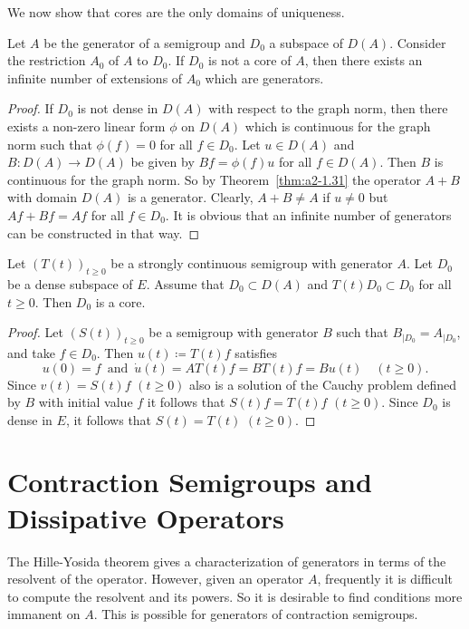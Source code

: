 We now show that cores are the only domains of uniqueness.
\begin{theorem}\label{thm:a2-1.33}
Let $A$ be the generator of a semigroup and $D_{0}$ a subspace of\/ $D(A)$.
Consider the restriction $A_{0}$ of\/ $A$ to $D_{0}$.
If\/ $D_{0}$ is not a core of\/ $A$, then there exists an infinite number of extensions of\/ $A_{0}$ which are generators.
\end{theorem}
\begin{proof}
If\/ $D_{0}$ is not dense in $D(A)$ with respect to the graph norm, then there exists a non-zero linear form $\phi$ on $D(A)$ which is continuous for the graph norm such that $\phi(f) = 0$ for all $f \in D_{0}$. 
Let $u \in D(A)$ and $B \colon D(A) \to D(A)$ be given by $Bf = \phi(f)u$ for all $f \in D(A)$.
Then $B$ is continuous for the graph norm.
So by Theorem~\ref{thm:a2-1.31}   the operator $A+B$ with domain $D(A)$ is a generator.
Clearly, $A+B \neq A$ if\/ $u \neq 0$ but $Af+Bf = Af$ for all $f \in D_{0}$.
It is obvious that an infinite number of generators can be constructed in that way.
\end{proof}
\begin{corollary}\label{cor:a2-1.34}
Let $(T(t))_{t\geq 0}$ be a strongly continuous semigroup with generator $A$.
Let $D_{0}$ be a dense subspace of\/ $E$.
Assume that $D_{0} \subset D(A)$ and $T(t)D_{0} \subset D_{0}$ for all $t \geq 0$.
Then $D_{0}$ is a core.
\end{corollary}
\begin{proof}
Let $(S(t))_{t\geq 0}$ be a semigroup with generator $B$ such that $B_{\vert D_{0}} = A_{\vert D_{0}}$, and take $f \in D_{0}$.
Then $u(t) \coloneqq T(t)f$ satisfies 
\[
u(0) = f\,  \text{ and } \,\dot{u}(t) = AT(t)f = BT(t)f = Bu(t) \quad (t \geq 0).
\]
Since $v(t) = S(t)f$ $(t \geq 0)$ also is a solution of the Cauchy problem defined by $B$ with initial value $f$ it follows that $S(t)f = T(t)f$ $(t\geq 0)$.
Since $D_{0}$ is dense in $E$, it follows that $S(t) = T(t)$ $(t \geq 0)$.
\end{proof}
\section{Contraction Semigroups and Dissipative Operators}\label{sec:a2-2}%
\hspace{1cm}{\Large by Wolfgang Arendt}
\vspace{.5cm}
\newline
The Hille-Yosida theorem gives a characterization of generators in terms of the resolvent of the operator.
However, given an operator $A$, frequently it is difficult to compute the resolvent and its powers.
So it is desirable to find conditions more immanent on $A$.
This is possible for generators of contraction semigroups.


